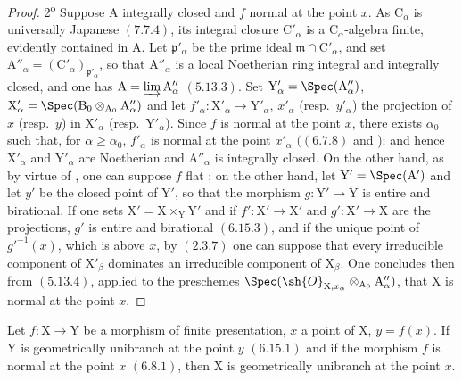 \begin{proof}
2\textsuperscript{o} Suppose $\mathrm{A}$ integrally closed and $f$ normal at the point $x$. As $\mathrm{C}_\alpha$ is universally Japanese $(7.7.4)$, its integral closure $\mathrm{C}'_\alpha$ is a $\mathrm{C}_\alpha$-algebra finite, evidently contained in $\mathrm{A}$. Let $\mathfrak{p}'_\alpha$ be the prime ideal $\mathfrak{m}\cap\mathrm{C}'_\alpha$, and set $\mathrm{A}''_\alpha=(\mathrm{C}'_\alpha)_{\mathfrak{p}'_\alpha}$, so that $\mathrm{A}''_\alpha$ is a local Noetherian ring integral and integrally closed, and one has $\mathrm{A}=\varinjlim\mathrm{A}''_\alpha$ $(5.13.3)$. Set $\mathrm{Y}'_\alpha=\Spec(\mathrm{A}''_\alpha)$, $\mathrm{X}'_\alpha=\Spec(\mathrm{B}_0\otimes_{\mathrm{A}_0}\mathrm{A}''_\alpha)$ and let $f'_\alpha:\mathrm{X}'_\alpha\to\mathrm{Y}'_\alpha$, $x'_\alpha$ (resp.\ $y'_\alpha$) the projection of $x$ (resp.\ $y$) in $\mathrm{X}'_\alpha$ (resp.\ $\mathrm{Y}'_\alpha$). Since $f$ is normal at the point $x$, there exists $\alpha_0$ such that, for $\alpha\geqslant\alpha_0$, $f'_\alpha$ is normal at the point $x'_\alpha$ $((6.7.8)$ and ); and hence $\mathrm{X}'_\alpha$ and $\mathrm{Y}'_\alpha$ are Noetherian and $\mathrm{A}''_\alpha$ is integrally closed. On the other hand, as by virtue of , one can suppose $f$ flat ; on the other hand, let $\mathrm{Y}'=\Spec(\mathrm{A}')$ and let $y'$ be the closed point of $\mathrm{Y}'$, so that the morphism $g:\mathrm{Y}'\to\mathrm{Y}$ is entire and birational. If one sets $\mathrm{X}'=\mathrm{X}\times_\mathrm{Y}\mathrm{Y}'$ and if $f':\mathrm{X}'\to\mathrm{X}'$ and $g':\mathrm{X}'\to\mathrm{X}$ are the projections, $g'$ is entire and birational $(6.15.3)$, and if the unique point of $g'^{-1}(x)$, which is above $x$, by $(2.3.7)$ one can suppose that every irreducible component of $\mathrm{X}'_\beta$ dominates an irreducible component of $\mathrm{X}_\beta$. One concludes then from $(5.13.4)$, applied to the preschemes $\Spec(\sh{O}_{\mathrm{X},x_\alpha}\otimes_{\mathrm{A}_0}\mathrm{A}''_\alpha)$, that $\mathrm{X}$ is normal at the point $x$.
\end{proof}

\begin{corollary}[11.3.14]
\label{IV.11.3.14}
Let $f:\mathrm{X}\to\mathrm{Y}$ be a morphism of finite presentation, $x$ a point of $\mathrm{X}$, $y=f(x)$. If $\mathrm{Y}$ is geometrically unibranch at the point $y$ $(6.15.1)$ and if the morphism $f$ is normal at the point $x$ $(6.8.1)$, then $\mathrm{X}$ is geometrically unibranch at the point $x$.
\end{corollary}

